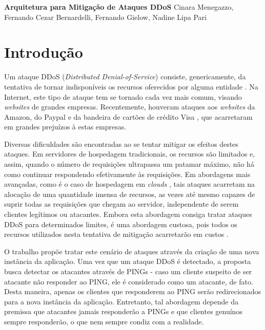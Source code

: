 \documentclass[a4paper, 11pt]{article}
\begin{document}
{
\begin{center}
{\LARGE \textbf{Arquitetura para Mitiga\c{c}\~{a}o de Ataques DDoS}}
\vskip 0.5cm
{\Large Cinara Menegazzo, Fernando Cezar Bernardelli, Fernando Gielow, Nadine
Lipa Pari}
\end{center}
}

\section{Introdu\c{c}\~{a}o}

Um ataque DDoS (\emph{Distributed Denial-of-Service})
 consiste, genericamente, da tentativa de tornar indisponíveis
os recursos oferecidos por alguma entidade \cite{Zhang:11}. Na Internet, este
tipo de ataque tem se tornado cada vez mais comum, visando \emph{websites} de
grandes empresas. Recentemente, houveram ataques aos \emph{websites} da Amazon,
do Paypal e da bandeira de cartões de crédito Visa \cite{Zuckerman:10,ddosatks},
que
acarretaram em grandes prejuízos à estas empresas.

Diversas dificuldades são encontradas ao se tentar mitigar os efeitos destes
ataques. Em servidores de hospedagem tradicionais, os recursos são limitados e,
assim, quando o número de requisições ultrapassa um patamar máximo, não há como
continuar respondendo efetivamente às requisições. Em abordagens mais avançadas,
como é o caso de hospedagem em \emph{clouds} \cite{Zhang:10}, tais ataques
acarretam na alocação de uma quantidade imensa de recursos, as vezes até mesmo
capazes de
suprir todas as requisições que chegam ao servidor, independente de serem
clientes legítimos ou atacantes. Embora esta abordagem consiga tratar ataques
DDoS para determinados limites, é uma abordagem custosa, pois todos os recursos
utilizados nesta tentativa de mitigação acarretar\~ao em custos
\cite{Soon:10}.

O trabalho \cite{Bakshi:10} prop\~oe tratar este cen\'ario de ataques através da
criação de uma nova instância da aplicação. Uma vez que um ataque DDoS é
detectado, a proposta busca detectar os atacantes através de PINGs -
caso um cliente suspeito de ser atacante não responder ao PING, ele é
considerado como um
atacante, de fato. Desta maneira, apenas os clientes que responderem ao PING
serão
redirecionados para a nova instância da aplicação. Entretanto, tal abordagem
depende da premissa que atacantes jamais responderão a PINGs e que clientes
genuínos sempre responderão, o que nem sempre condiz com a realidade.
\end{document}
